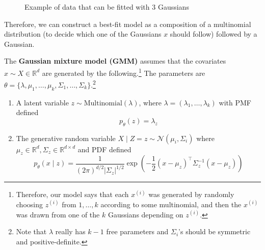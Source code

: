 \begin{figure}[H]
    \caption{Example of data that can be fitted with 3 Gaussians}
  \end{figure}

  Therefore, we can construct a best-fit model as a composition of a multinomial distribution (to decide which one of the Gaussians $x$ should follow) followed by a Gaussian. 

  \begin{definition} 
    The \textbf{Gaussian mixture model (GMM)} assumes that the covariates $x \sim X \in \mathbb{R}^d$ are generated by the following.\footnote{Therefore, our model says that each $x^{(i)}$ was generated by randomly choosing $z^{(i)}$ from ${1, \ldots, k}$ according to some multinomial, and then the $x^{(i)}$ was drawn from one of the $k$ Gaussians depending on $z^{(i)}$.} The parameters are $\theta = \{\lambda, \mu_1, \ldots, \mu_k, \Sigma_1, \ldots, \Sigma_k\}$.\footnote{Note that $\lambda$ really has $k-1$ free parameters and $\Sigma_i$'s should be symmetric and positive-definite.}

    \begin{enumerate}
      \item A latent variable $z \sim \mathrm{Multinomial}(\lambda)$, where $\lambda = (\lambda_1, \ldots, \lambda_k)$ with PMF defined 
      \begin{equation}
        p_\theta (z) = \lambda_z
      \end{equation}

      \item The generative random variable $X \mid Z = z \sim \mathcal{N}(\mu_i, \Sigma_i)$ where $\mu_z \in \mathbb{R}^d, \Sigma_z \in \mathbb{R}^{d \times d}$ and PDF defined 
      \begin{equation}
        p_\theta (x \mid z) = \frac{1}{(2\pi)^{d/2}|\Sigma_z|^{1/2}} \exp\left(-\frac{1}{2}(x-\mu_z)^\top\Sigma_z^{-1}(x-\mu_z)\right)
      \end{equation}
    \end{enumerate}
  \end{definition}


